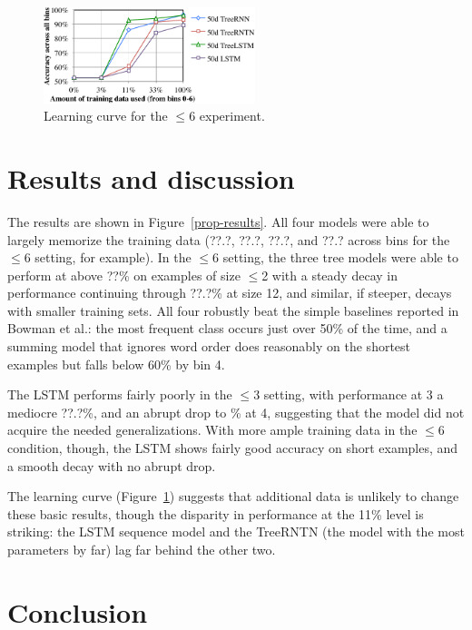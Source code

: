 \begin{figure}[t]
  \centering
      \includegraphics[height=1.1in]{lcc.pdf}
  \caption{Learning curve for the $\le6$ experiment.}
  \label{fig:lc} 
\end{figure}

\section{Results and discussion}\label{sec:discussion}

The results are shown in Figure~\ref{prop-results}. All four models were able to largely memorize the training data (??.?, ??.?, ??.?, and ??.? across bins for the $\le$6 setting, for example). In the $\le$6 setting, the three tree models were able to perform at above ??\% on examples of size $\le$2 with a steady decay in performance continuing through ??.?\% at size 12, and similar, if steeper, decays with smaller training sets. All four robustly beat the simple baselines reported in Bowman et al.: the most frequent class occurs just over 50\% of the time, and a summing model that ignores word order does reasonably on the shortest examples but falls below 60\% by bin 4.

The LSTM performs fairly poorly in the $\le3$ setting, with performance at 3 a mediocre ??.?\%, and an abrupt drop to \% at 4, suggesting that the model did not acquire the needed generalizations. With more ample training data in the $\le6$ condition, though, the LSTM shows fairly good accuracy on short examples, and a smooth decay with no abrupt drop. 

The learning curve (Figure~\ref{fig:lc}) suggests that additional data is unlikely to change these basic results, though the disparity in performance at the 11\% level is striking: the LSTM sequence model and the TreeRNTN (the model with the most parameters by far) lag far behind the other two.

\section{Conclusion}

